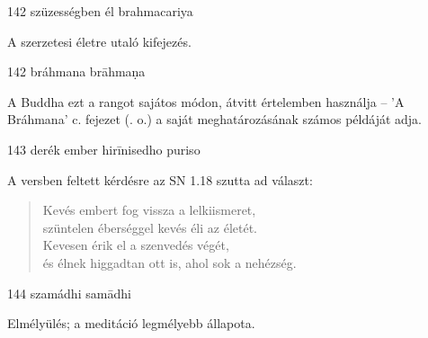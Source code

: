 
\begin{notesdescription}

\item[{142}
{szüzességben él}
{brahmacariya}] \hfill\par

A szerzetesi életre utaló kifejezés.

\item[{142}
{bráhmana}
{brāhmaṇa}] \hfill\par

A Buddha ezt a rangot sajátos módon, átvitt értelemben használja -- 'A Bráhmana' c. fejezet (\pageref{brahmana-vagga}. o.) a saját meghatározásának számos példáját adja.

\item[{143}
{derék ember}
{hirīnisedho puriso}] \hfill\par

A versben feltett kérdésre az SN 1.18 szutta ad választ:

\begin{verse}
Kevés embert fog vissza a lelkiismeret,\\
szüntelen éberséggel kevés éli az életét.\\
Kevesen érik el a szenvedés végét,\\
és élnek higgadtan ott is, ahol sok a nehézség.
\end{verse}

\item[{144}
{szamádhi}
{samādhi}] \hfill\par

Elmélyülés; a meditáció legmélyebb állapota.

\end{notesdescription}

